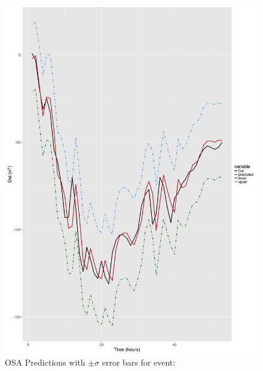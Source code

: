 \documentclass[sw, draft]{AGUTeX}
\begin{document}
\begin{figure}
\noindent\includegraphics[width=\textwidth]{PredictionsModel1/PredErrBars_Storm8.png}
\caption{OSA Predictions with $\pm \sigma$ error bars for event: }
\label{fig:ComparePred2}
\end{figure}
\end{document}
